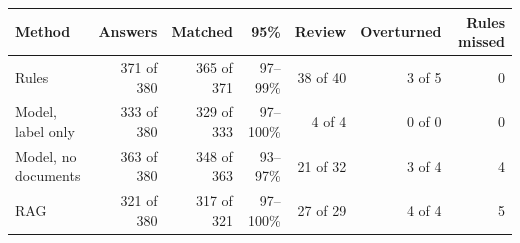 \begin{tabular}{lrrrrrr}
\toprule
Method & Answers & Matched & 95\% & Review & Overturned & Rules missed \\
\midrule
Rules & 371 of 380 & 365 of 371 & 97--99\% & 38 of 40 & 3 of 5 & 0 \\
Model, label only & 333 of 380 & 329 of 333 & 97--100\% & 4 of 4 & 0 of 0 & 0 \\
Model, no documents & 363 of 380 & 348 of 363 & 93--97\% & 21 of 32 & 3 of 4 & 4 \\
RAG & 321 of 380 & 317 of 321 & 97--100\% & 27 of 29 & 4 of 4 & 5 \\
\bottomrule
\end{tabular}
